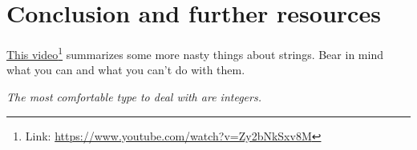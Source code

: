 \section{Conclusion and further resources}

\href{https://www.youtube.com/watch?v=Zy2bNkSxv8M}{This video}\footnote{Link: \href{https://www.youtube.com/watch?v=Zy2bNkSxv8M}{https://www.youtube.com/watch?v=Zy2bNkSxv8M}} summarizes some more nasty things about strings. Bear in mind what you can and what you can't do with them.


\begin{center}
\textit{The most comfortable type to deal with are integers.}
\end{center}

